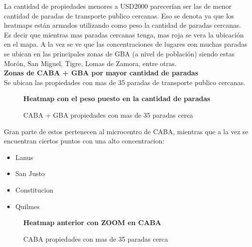 \documentclass[a4paper, 10pt]{article}
\begin{document}
				La cantidad de propiedades menores a \textdollar USD2000 parecerían ser las de menor 
				cantidad de paradas de transporte publico cercanas. Eso se denota ya que los heatmaps 
				están armados utilizando como peso la cantidad de paradas cercanas. Es decir que 
				mientras mas paradas cercanas tenga, mas roja se vera la ubicación en el mapa. 
				A la vez se ve que las concentraciones de lugares con muchas paradas se ubican en 
				las principales zonas de GBA (a nivel de población) siendo estas Morón, 
				San Miguel, Tigre, Lomas de Zamora, entre otras.\\
				
				\textbf{Zonas de CABA + GBA por mayor cantidad de paradas}\\
				Se ubican las propiedades con mas de 35 paradas de transporte publico cercanas.
				
				\begin{figure}
    				\centering
    				\textbf{Heatmap con el peso puesto en la cantidad de paradas}\par\medskip
    				\caption{CABA + GBA propiedades con mas de 35 paradas cerca}
				\end{figure}
				\FloatBarrier				
				
				Gran parte de estos pertenecen al microcentro de CABA, mientras que a la vez se 
				encuentran ciertos puntos con una alto concentracion:
				\begin{itemize}
					\item Lanus
					\item San Justo
					\item Constitucion
					\item Quilmes
				\end{itemize}
				\begin{figure}
    				\centering
    				\textbf{Heatmap anterior con ZOOM en CABA}\par\medskip
    				\caption{CABA propiedades con mas de 35 paradas cerca}
				\end{figure}
\end{document}
